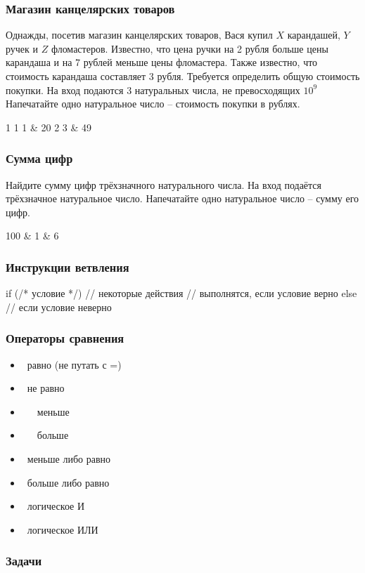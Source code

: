 \begin{frame}
	\frametitle{Магазин канцелярских товаров}
	Однажды, посетив магазин канцелярских товаров, Вася купил $X$ карандашей, $Y$ ручек
	и $Z$ фломастеров. Известно, что цена ручки на 2 рубля больше цены карандаша и
	на 7 рублей меньше цены фломастера. Также известно, что стоимость карандаша
	составляет 3 рубля. Требуется определить общую стоимость покупки. 
	\inp
	На вход подаются 3 натуральных числа, не превосходящих $10^9$
	\out
	Напечатайте одно натуральное число -- стоимость покупки в рублях.
	\begin{ex}
	1 1 1 & 20  2 3 & 49 \tb
	\end{ex}
\end{frame}

\begin{frame}
	\frametitle{Сумма цифр}
	Найдите сумму цифр трёхзначного натурального числа.
	\inp
	На вход подаётся трёхзначное натуральное число.
	\out
	Напечатайте одно натуральное число -- сумму его цифр.
	\begin{ex}
		100 & 1  & 6 \tb
	\end{ex}
\end{frame}

\begin{frame}[fragile]
	\frametitle{Инструкции ветвления}
	\begin{code}
if (/* условие */)
{
	// некоторые действия
	// выполнятся, если условие верно
}
else
{
	// если условие неверно
}
	\end{code}
\end{frame}

\begin{frame}
	\frametitle{Операторы сравнения}
	\begin{itemize}
		\item \lcode{==} \ равно (не путать с =) 
		\item \lcode{!=} \ не равно
		\item \lcode{<} \ \ \ меньше
		\item \lcode{>} \ \ \ больше
		\item \lcode{<=} \ меньше либо равно
		\item \lcode{>=} \ больше либо равно
		\item \lcode{&&} \ логическое И
		\item \lcode{||} \ логическое ИЛИ
	\end{itemize}
\end{frame}

\begin{frame}
	\frametitle{Задачи}
\end{frame}

